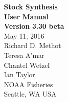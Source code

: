 \documentclass[12pt]{article}
\begin{document}
	\begin{titlepage}
			\begin{center}
				\huge{\bfseries Stock Synthesis}\\
				\huge{\bfseries User Manual}\\		
				[0.50in]
				\huge{\bfseries Version 3.30 beta}\\
				[1in]
				\LARGE{May 11, 2016}\\
				[1in]
				\LARGE{Richard D. Methot}\\
				\LARGE{Teresa A'mar}\\
			    \LARGE{Chantel Wetzel}\\
			    \LARGE{Ian Taylor}\\
			    [1in]
				NOAA Fisheries\\
				Seattle, WA USA\\		
			\end{center}
		\end{titlepage}
		
		\tableofcontents
		\thispagestyle{empty}
		\cleardoublepage
		\setcounter{page}{1}
		\newpage
		
		\renewcommand{\headrulewidth}{0pt} %
		\cleardoublepage

		
		
		
		
		
		
		
		
				
			
		
			
			
			
			
		
				
\end{document}
